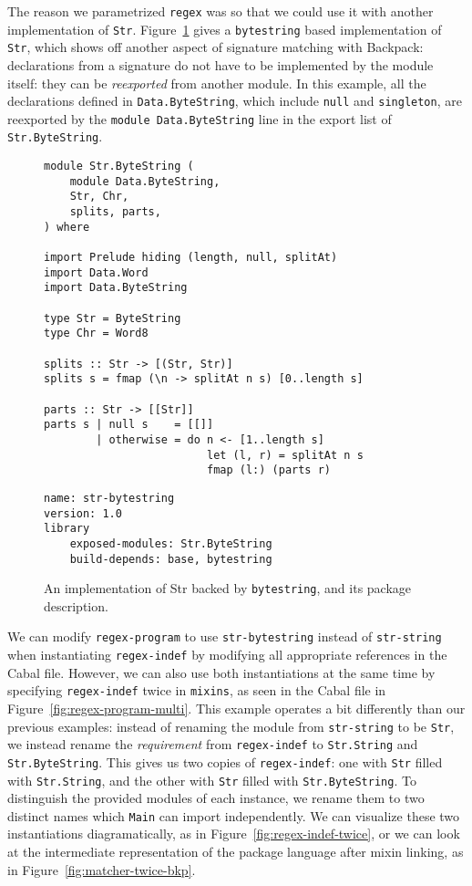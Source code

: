 The reason we parametrized \verb|regex| was so that we could use it
with another implementation of \verb|Str|.  Figure~\ref{fig:str-bytestring}
gives a \verb|bytestring| based implementation of \verb|Str|, which shows
off another aspect of signature matching with Backpack: declarations from
a signature do not have to be implemented by the module itself: they can
be \emph{reexported} from another module.  In this example, all the declarations
defined in \verb|Data.ByteString|, which include \verb|null| and \verb|singleton|,
are reexported by the \verb|module Data.ByteString| line in the export list
of \verb|Str.ByteString|.

\begin{figure}
\begin{lstlisting}
module Str.ByteString (
    module Data.ByteString,
    Str, Chr,
    splits, parts,
) where

import Prelude hiding (length, null, splitAt)
import Data.Word
import Data.ByteString

type Str = ByteString
type Chr = Word8

splits :: Str -> [(Str, Str)]
splits s = fmap (\n -> splitAt n s) [0..length s]

parts :: Str -> [[Str]]
parts s | null s    = [[]]
        | otherwise = do n <- [1..length s]
                         let (l, r) = splitAt n s
                         fmap (l:) (parts r)
\end{lstlisting}
\begin{lstlisting}[language=Cabal]
name: str-bytestring
version: 1.0
library
    exposed-modules: Str.ByteString
    build-depends: base, bytestring
\end{lstlisting}
\caption{An implementation of Str backed by \texttt{bytestring},
and its package description.}
\label{fig:str-bytestring}
\end{figure}

We can modify \verb|regex-program| to use \verb|str-bytestring| instead
of \verb|str-string| when instantiating \verb|regex-indef| by modifying
all appropriate references in the Cabal file.  However, we can also use
both instantiations at the same time by specifying \verb|regex-indef|
twice in \verb|mixins|, as seen in the Cabal file in
Figure~\ref{fig:regex-program-multi}.
This example operates a bit differently than our previous examples:
instead of renaming the module from \verb|str-string| to be \verb|Str|,
we instead rename the \emph{requirement} from \verb|regex-indef| to
\verb|Str.String| and \verb|Str.ByteString|.  This gives us two copies
of \verb|regex-indef|: one with \verb|Str| filled with
\verb|Str.String|, and the other with \verb|Str| filled with
\verb|Str.ByteString|.  To distinguish the provided modules of each
instance, we rename them to two distinct names which \verb|Main|
can import independently.  We can visualize these two instantiations
diagramatically, as in Figure~\ref{fig:regex-indef-twice}, or
we can look at the intermediate representation of the package language
after mixin linking, as in Figure~\ref{fig:matcher-twice-bkp}.

